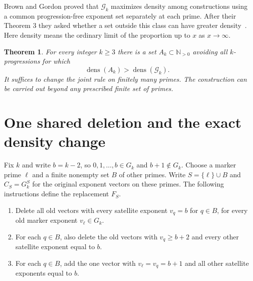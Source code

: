 \documentclass[11pt]{article}
\newtheorem{theorem}{Theorem}
\newcommand{\N}{\mathbb N}
\newcommand{\dens}{\operatorname{dens}}
\newcommand{\GP}{\mathcal G_k}
\begin{document}
Brown and Gordon proved that $\GP$ maximizes density among constructions using a common progression-free exponent set separately at each prime. After their Theorem 3 they asked whether a set outside this class can have greater density~\cite{BG}. Here density means the ordinary limit of the proportion up to $x$ as $x\to\infty$.
\begin{theorem}\label{main}
For every integer $k\ge3$ there is a set $A_k\subset\N_{>0}$ avoiding all $k$-progressions for which
\[
                    \dens(A_k)>\dens(\GP).
\]
It suffices to change the joint rule on finitely many primes. The construction can be carried out beyond any prescribed finite set of primes.
\end{theorem}

\section{One shared deletion and the exact density change}

Fix $k$ and write $b=k-2$, so $0,1,\ldots,b\in G_k$ and $b+1\notin G_k$. Choose a marker prime $\ell$ and a finite nonempty set $B$ of other primes. Write $S=\{\ell\}\cup B$ and $C_S=G_k^{S}$ for the original exponent vectors on these primes. The following instructions define the replacement $F_S$.

\begin{enumerate}
\item Delete all old vectors with every satellite exponent $v_q=b$ for $q\in B$, for every old marker exponent $v_\ell\in G_k$.
\item For each $q\in B$, also delete the old vectors with $v_q\ge b+2$ and every other satellite exponent equal to $b$.
\item For each $q\in B$, add the one vector with $v_\ell=v_q=b+1$ and all other satellite exponents equal to $b$.
\end{enumerate}
\end{document}
